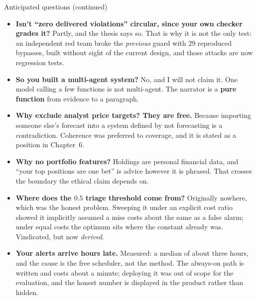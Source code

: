 \documentclass[aspectratio=169]{beamer}
\begin{document}
\begin{frame}{Anticipated questions (continued)}
\footnotesize
\begin{itemize}
  \item \textbf{Isn't ``zero delivered violations'' circular, since your own checker grades it?}
        Partly, and the thesis says so. That is why it is not the only test: an independent
        red team broke the \emph{previous} guard with 29 reproduced bypasses, built without
        sight of the current design, and those attacks are now regression tests.
  \item \textbf{So you built a multi-agent system?} No, and I will not claim it. One model
        calling a few functions is not multi-agent. The narrator is a \textbf{pure function}
        from evidence to a paragraph.
  \item \textbf{Why exclude analyst price targets? They are free.} Because importing someone
        else's forecast into a system defined by not forecasting is a contradiction. Coherence
        was preferred to coverage, and it is stated as a position in Chapter~6.
  \item \textbf{Why no portfolio features?} Holdings are personal financial data, and
        ``your top positions are one bet'' is advice however it is phrased. That crosses the
        boundary the ethical claim depends on.
  \item \textbf{Where does the $0.5$ triage threshold come from?} Originally nowhere, which was
        the honest problem. Sweeping it under an explicit cost ratio showed it implicitly assumed
        a miss costs about the same as a false alarm; under equal costs the optimum sits where
        the constant already was. Vindicated, but now \emph{derived}.
  \item \textbf{Your alerts arrive hours late.} Measured: a median of about three hours, and the
        cause is the free scheduler, not the method. The always-on path is written and costs
        about a minute; deploying it was out of scope for the evaluation, and the honest number
        is displayed in the product rather than hidden.
\end{itemize}
\end{frame}
\end{document}
